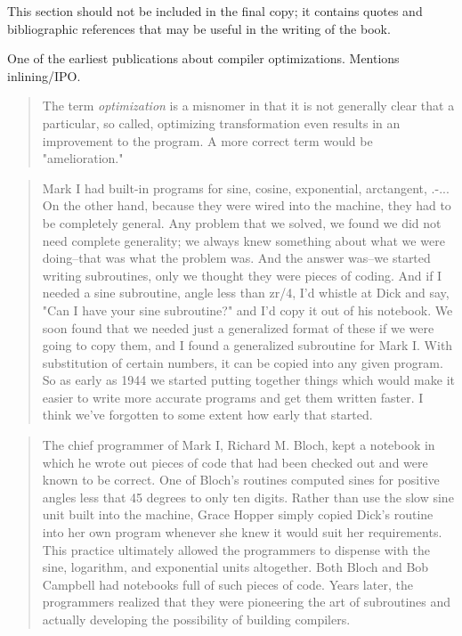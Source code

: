 
This section should not be included in the final copy;
it contains quotes and bibliographic references that may be useful in the writing of the book.

\vspace{1em}


One of the earliest publications about compiler optimizations. Mentions inlining/IPO.

\begin{quotation}
The term \textit{optimization} is a misnomer in that it is not generally clear that a particular, so called, optimizing transformation even results in an improvement to the program. A more correct term would be "amelioration."
\end{quotation}

\begin{quotation}
    Mark I had built-in programs for sine, cosine, exponential, arctangent, .-... On the
other hand, because they were wired into the machine, they had to be completely general.
Any problem that we solved, we found we did not need complete generality; we always
knew something about what we were doing--that was what the problem was. And the answer was--we started writing subroutines, only we thought they were pieces of coding.
And if I needed a sine subroutine, angle less than zr/4, I'd whistle at Dick and say, "Can I
have your sine subroutine?" and I'd copy it out of his notebook. We soon found that we
needed just a generalized format of these if we were going to copy them, and I found a
generalized subroutine for Mark I. With substitution of certain numbers, it can be copied
into any given program. So as early as 1944 we started putting together things which would
make it easier to write more accurate programs and get them written faster. I think we've
forgotten to some extent how early that started.
\end{quotation}


\begin{quotation}
The chief programmer of Mark I, Richard M. Bloch, kept a notebook in which he wrote out pieces of code
that had been checked out and were known to be correct. One of Bloch's routines computed sines for
positive angles less that 45 degrees to only ten digits. Rather than use the slow sine unit built into the
machine, Grace Hopper simply copied Dick's routine into her own program whenever she knew it would suit
her requirements. This practice ultimately allowed the programmers to dispense with the sine, logarithm, and
exponential units altogether. Both Bloch and Bob Campbell had notebooks full of such pieces of code. Years
later, the programmers realized that they were pioneering the art of subroutines and actually developing the
possibility of building compilers.
\end{quotation}

